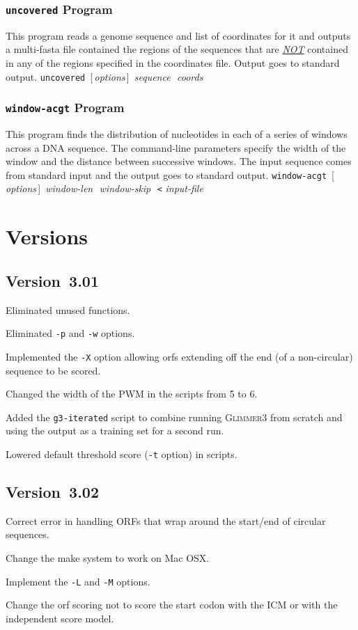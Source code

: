 \documentclass[fleqn,titlepage,11pt]{article}
\def\Desc#1{\,\mbox{\emph{#1}}\,}
\def\Gthree{\textsc{Glimmer3}}
\def\Pg#1{\texttt{#1}}
\begin{document}
\subsubsection{\Pg{uncovered} Program}
This program reads a genome sequence and list of coordinates
for it and outputs a multi-fasta file contained the regions of the
sequences that are \underline{\emph{NOT}} contained in any of
the regions specified in the coordinates file.
Output goes to standard output.
\bq
  \Pg{uncovered}\, [\Desc{options}] \Desc{sequence} \Desc{coords}
\eq

\subsubsection{\Pg{window-acgt} Program}
This program finds the distribution of nucleotides in each of a
series of windows across a DNA sequence.  The command-line parameters
specify the width of the window and the distance between successive
windows.  The input sequence comes from standard input and the output
goes to standard output.
\bq
  \Pg{window-acgt}\, [\Desc{options}] \Desc{window-len} \Desc{window-skip} \,\Pg{<}\,\Desc{input-file}
\eq


\section{Versions}

\subsection{Version~3.01}
  \bi\RaggedRight
  \item
    Eliminated unused functions.
  \item
    Eliminated \Pg{-p} and \Pg{-w} options.
  \item
    Implemented the \Pg{-X} option allowing orfs extending off the
    end (of a non-circular) sequence to be scored.
  \item
    Changed the width of the PWM in the scripts from 5 to 6.
  \item
    Added the \Pg{g3-iterated} script to combine running \Gthree{} from
    scratch and using the output as a training set for a second run.
  \item
    Lowered default threshold score (\Pg{-t} option) in scripts.
  \ei

\subsection{Version~3.02}
  \bi\RaggedRight
  \item
    Correct error in handling ORFs that wrap around the start/end
    of circular sequences.
  \item
    Change the make system to work on Mac OSX.
  \item
    Implement the \Pg{-L} and \Pg{-M} options.
  \item
    Change the orf scoring not to score the start codon with the
    ICM or with the independent score model.
  \ei

\raggedright


\end{document}
